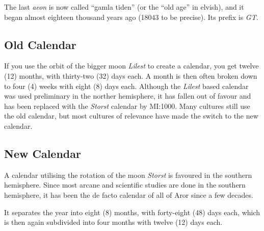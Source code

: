 The last \emph{aeon} is now called ``gamla tiden'' (or the ``old age''
in elvish), and it began almost eighteen thousand years ago (18043 to
be precise). Its prefix is \emph{GT}.

\subsection{Old Calendar}

If you use the orbit of the bigger moon \emph{Lilest} to create a
calendar, you get twelve (12) months, with thirty-two (32) days
each. A month is then often broken down to four (4) weeks with eight
(8) days each. Although the \emph{Lilest} based calendar was used
preliminary in the norther hemisphere, it has fallen out of favour and
has been replaced with the \emph{Storst} calendar by MI:1000. Many
cultures still use the old calendar, but most cultures of relevance
have made the switch to the new calendar.

\subsection{New Calendar}

A calendar utilising the rotation of the moon \emph{Storst} is favoured
in the southern hemisphere. Since most arcane and scientific studies are
done in the southern hemisphere, it has been the de facto calendar of all
of Aror since a few decades.

It separates the year into eight (8) months, with forty-eight (48) days
each, which is then again subdivided into four months with twelve (12)
days each.

